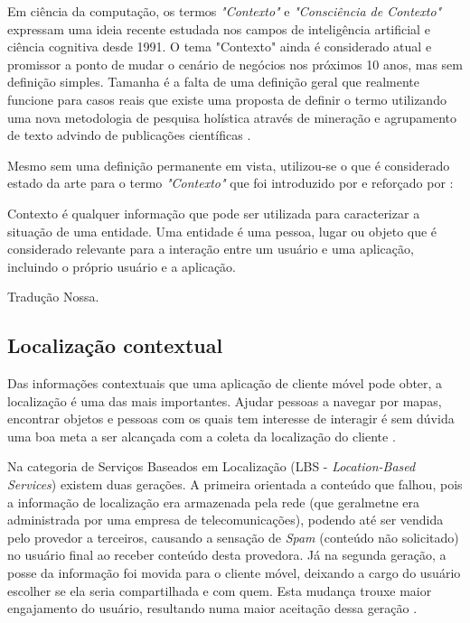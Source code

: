 Em ciência da computação, os termos \emph{"Contexto"} e \emph{"Consciência
de Contexto"} expressam uma ideia recente estudada nos campos de inteligência
artificial e ciência cognitiva desde 1991. O tema "Contexto"  ainda é considerado
atual e promissor a ponto de mudar o cenário de negócios nos próximos 10 anos, mas
sem definição simples. Tamanha é a falta de uma definição geral que
realmente funcione para casos reais que existe uma proposta de definir o termo
utilizando uma nova metodologia de pesquisa holística através de mineração e
agrupamento de texto advindo de publicações científicas \cite{Pascalau2013}.

Mesmo sem uma definição permanente em vista, utilizou-se o que é considerado
estado da arte para o termo \emph{"Contexto"} que foi introduzido por
 e reforçado por :

\begin{citacao}

	Contexto é qualquer informação que pode ser utilizada para caracterizar a
	situação de uma entidade. Uma entidade é uma pessoa, lugar ou objeto que é
	considerado relevante para a interação entre um usuário e uma aplicação,
	incluindo o próprio usuário e a aplicação. \

	 Tradução Nossa.
\end{citacao}

\subsection{Localização contextual}
\label{subsec:Localização contextual}

Das informações contextuais que uma aplicação de cliente móvel pode obter, a
localização é uma das mais importantes. Ajudar pessoas a navegar por mapas,
encontrar objetos e pessoas com os quais tem interesse de interagir é sem dúvida
uma boa meta a ser alcançada com a coleta da localização do cliente
\cite{Bellavista2008}.

Na categoria de Serviços Baseados em Localização (LBS - \emph{Location-Based
Services}) existem duas gerações. A primeira orientada a conteúdo que falhou,
pois a informação de localização era armazenada pela rede (que geralmetne era
administrada por uma empresa de telecomunicações), podendo até ser vendida pelo
provedor a terceiros, causando a sensação de \emph{Spam} (conteúdo não
solicitado) no usuário final ao receber conteúdo desta provedora. Já na segunda
geração, a posse da informação foi movida para o cliente móvel, deixando a cargo
do usuário escolher se ela seria compartilhada e com quem. Esta mudança trouxe
maior engajamento do usuário, resultando numa maior aceitação dessa geração
\cite{Bellavista2008}.


